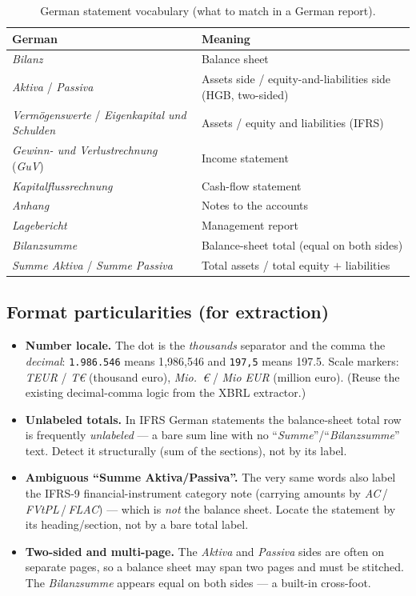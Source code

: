 \documentclass[11pt,a4paper]{report}
\begin{document}
\begin{table}[h]
\centering
\caption{German statement vocabulary (what to match in a German report).}
\label{tab:de-vocab}
\small
\begin{tabular}{@{}p{}p{}@{}}
\toprule
\textbf{German} & \textbf{Meaning} \\
\midrule
\emph{Bilanz} & Balance sheet \\
\emph{Aktiva} / \emph{Passiva} & Assets side / equity-and-liabilities side (HGB, two-sided) \\
\emph{Vermögenswerte} / \emph{Eigenkapital und Schulden} & Assets / equity and liabilities (IFRS) \\
\emph{Gewinn- und Verlustrechnung} (\emph{GuV}) & Income statement \\
\emph{Kapitalflussrechnung} & Cash-flow statement \\
\emph{Anhang} & Notes to the accounts \\
\emph{Lagebericht} & Management report \\
\emph{Bilanzsumme} & Balance-sheet total (equal on both sides) \\
\emph{Summe Aktiva} / \emph{Summe Passiva} & Total assets / total equity \(+\) liabilities \\
\bottomrule
\end{tabular}
\end{table}

\subsection{Format particularities (for extraction)}

\begin{itemize}
  \item \textbf{Number locale.} The dot is the \emph{thousands} separator and the comma the \emph{decimal}:
    \texttt{1.986.546} means 1{,}986{,}546 and \texttt{197,5} means 197.5. Scale markers: \emph{TEUR} /
    \emph{T€} (thousand euro), \emph{Mio.\ €} / \emph{Mio EUR} (million euro). (Reuse the existing
    decimal-comma logic from the XBRL extractor.)
  \item \textbf{Unlabeled totals.} In IFRS German statements the balance-sheet total row is frequently
    \emph{unlabeled} --- a bare sum line with no ``\emph{Summe}''/``\emph{Bilanzsumme}'' text. Detect it
    structurally (sum of the sections), not by its label.
  \item \textbf{Ambiguous ``Summe Aktiva/Passiva''.} The very same words also label the IFRS-9
    financial-instrument category note (carrying amounts by \emph{AC}\,/\,\emph{FVtPL}\,/\,\emph{FLAC})
    --- which is \emph{not} the balance sheet. Locate the statement by its heading/section, not by a bare
    total label.
  \item \textbf{Two-sided and multi-page.} The \emph{Aktiva} and \emph{Passiva} sides are often on
    separate pages, so a balance sheet may span two pages and must be stitched. The \emph{Bilanzsumme}
    appears equal on both sides --- a built-in cross-foot.
\end{itemize}
\end{document}
